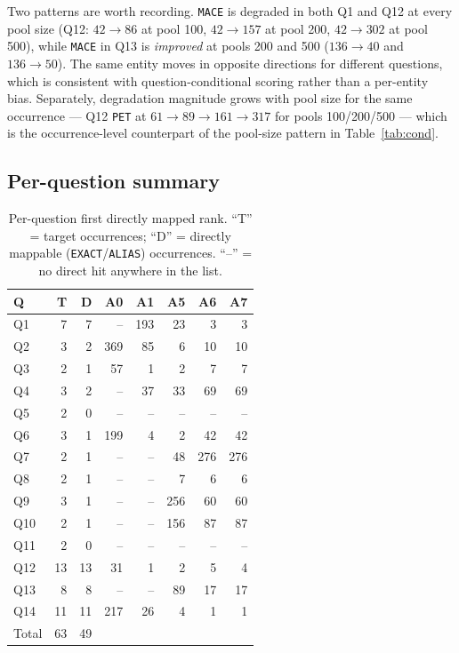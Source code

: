 \documentclass[11pt,a4paper]{article}
\begin{document}
Two patterns are worth recording. \texttt{MACE} is degraded in both Q1 and Q12 at every pool size (Q12:
$42 \to 86$ at pool 100, $42 \to 157$ at pool 200, $42 \to 302$ at pool 500), while \texttt{MACE} in Q13 is
\emph{improved} at pools 200 and 500 ($136 \to 40$ and $136 \to 50$). The same entity moves in opposite
directions for different questions, which is consistent with question-conditional scoring rather than a
per-entity bias. Separately, degradation magnitude grows with pool size for the same occurrence --- Q12
\texttt{PET} at $61 \to 89 \to 161 \to 317$ for pools 100/200/500 --- which is the occurrence-level counterpart
of the pool-size pattern in Table~\ref{tab:cond}.

\subsection{Per-question summary}

\begin{table}[htbp]
\centering
\small
\caption{Per-question first directly mapped rank. ``T'' = target occurrences; ``D'' = directly mappable
(\texttt{EXACT}/\texttt{ALIAS}) occurrences. ``--'' = no direct hit anywhere in the list.}
\label{tab:perq}
\begin{tabular}{lrrrrrrr}
\toprule
Q & T & D & A0 & A1 & A5 & A6 & A7 \\
\midrule
Q1  &  7 &  7 & --  & 193 &  23 &   3 &   3 \\
Q2  &  3 &  2 & 369 &  85 &   6 &  10 &  10 \\
Q3  &  2 &  1 &  57 &   1 &   2 &   7 &   7 \\
Q4  &  3 &  2 & --  &  37 &  33 &  69 &  69 \\
Q5  &  2 &  0 & --  & --  & --  & --  & --  \\
Q6  &  3 &  1 & 199 &   4 &   2 &  42 &  42 \\
Q7  &  2 &  1 & --  & --  &  48 & 276 & 276 \\
Q8  &  2 &  1 & --  & --  &   7 &   6 &   6 \\
Q9  &  3 &  1 & --  & --  & 256 &  60 &  60 \\
Q10 &  2 &  1 & --  & --  & 156 &  87 &  87 \\
Q11 &  2 &  0 & --  & --  & --  & --  & --  \\
Q12 & 13 & 13 &  31 &   1 &   2 &   5 &   4 \\
Q13 &  8 &  8 & --  & --  &  89 &  17 &  17 \\
Q14 & 11 & 11 & 217 &  26 &   4 &   1 &   1 \\
\midrule
Total & 63 & 49 & & & & & \\
\bottomrule
\end{tabular}
\end{table}
\end{document}
